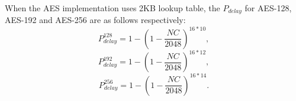 
When the AES implementation uses 2KB lookup table, the $P_{delay}$ for AES-128, AES-192 and AES-256 are as follows respectively:
\begin{equation*}
    P_{delay}^{128} = 1- (1-\frac{NC}{2048})^{16*10},
\end{equation*}
\begin{equation*}
    P_{delay}^{192} = 1- (1-\frac{NC}{2048})^{16*12},
\end{equation*}
\begin{equation*}
    P_{delay}^{256} = 1- (1-\frac{NC}{2048})^{16*14}.
\end{equation*} 